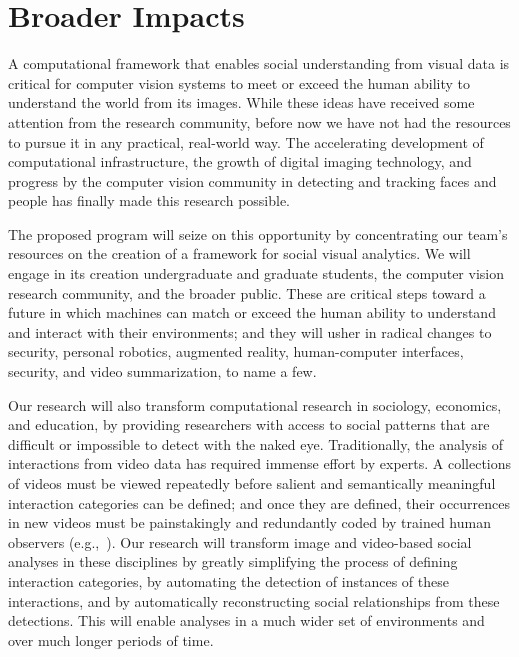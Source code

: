 
\section{Broader Impacts}
\label{sec:impacts}

A computational framework that enables social understanding from visual data is critical for computer vision systems to meet or exceed the human ability to understand the world from its images. While these ideas have received some attention from the research community, before now we have not had the resources to pursue it in any practical, real-world way. The accelerating development of computational infrastructure, the growth of digital imaging technology, and progress by the computer vision community in detecting and tracking faces and people has finally made this research possible. 

The proposed  program will seize on this opportunity by concentrating our team's resources on the creation of a  framework for social visual analytics.  We will engage in its creation undergraduate and graduate students, the computer vision research community, and the broader public. These are critical steps toward a future in which machines can match or exceed the human ability to understand and interact with their environments; and they will usher in radical changes to security, personal robotics, augmented reality, human-computer interfaces, security, and video summarization, to name a few.

Our research will also transform computational research in sociology, economics, and education, by providing researchers with access to social patterns that are difficult or impossible to detect with the naked eye. Traditionally, the analysis of interactions from video data has required immense effort by experts. A collections of videos must be viewed repeatedly before salient and semantically meaningful interaction categories can be defined; and once they are defined, their occurrences in new videos must be painstakingly and redundantly coded by trained human observers (e.g.,~\cite{Scherr2009}). Our research will transform image and video-based social analyses in these disciplines by greatly simplifying the process of defining interaction categories, by automating the detection of instances of these interactions, and by automatically reconstructing social relationships from these detections. This will enable analyses in a much wider set of environments and over much longer periods of time.

